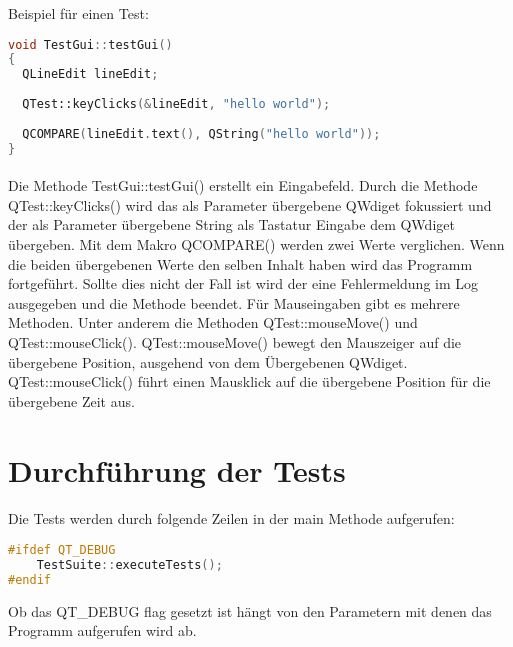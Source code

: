 		Beispiel für einen Test:
		\begin{lstlisting}[language=C++]
void TestGui::testGui()
{
  QLineEdit lineEdit;
	
  QTest::keyClicks(&lineEdit, "hello world");
		
  QCOMPARE(lineEdit.text(), QString("hello world"));
}
		\end{lstlisting}
		\paragraph{} Die Methode TestGui::testGui() erstellt ein Eingabefeld. Durch die Methode QTest::keyClicks() wird das als Parameter übergebene QWdiget fokussiert und der als Parameter übergebene String als Tastatur Eingabe dem QWdiget übergeben. Mit dem Makro QCOMPARE() werden zwei Werte verglichen. Wenn die beiden übergebenen Werte den selben Inhalt haben wird das Programm fortgeführt. Sollte dies nicht der Fall ist wird der eine Fehlermeldung im Log ausgegeben und die Methode beendet. Für Mauseingaben gibt es mehrere Methoden. Unter anderem die Methoden QTest::mouseMove() und QTest::mouseClick(). QTest::mouseMove() bewegt den Mauszeiger auf die übergebene Position, ausgehend von dem Übergebenen QWdiget. QTest::mouseClick() führt einen Mausklick auf die übergebene Position für die übergebene Zeit aus.
		
		\newpage
		
		\section{Durchführung der Tests}
		\paragraph{} Die Tests werden durch folgende Zeilen in der main Methode aufgerufen:
		\begin{lstlisting}[language=C++]
#ifdef QT_DEBUG
    TestSuite::executeTests();
#endif
		\end{lstlisting}
		Ob das QT\_DEBUG flag gesetzt ist hängt von den Parametern mit denen das Programm aufgerufen wird ab.
		
